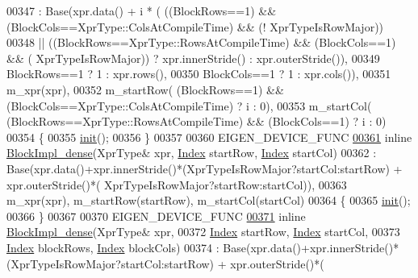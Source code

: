 \begin{DoxyCode}
00347       : Base(xpr.data() + i * (    ((BlockRows==1) && (BlockCols==XprType::ColsAtCompileTime) && (!
      XprTypeIsRowMajor)) 
00348                                 || ((BlockRows==XprType::RowsAtCompileTime) && (BlockCols==1) && ( 
      XprTypeIsRowMajor)) ? xpr.innerStride() : xpr.outerStride()),
00349              BlockRows==1 ? 1 : xpr.rows(),
00350              BlockCols==1 ? 1 : xpr.cols()),
00351         m\_xpr(xpr),
00352         m\_startRow( (BlockRows==1) && (BlockCols==XprType::ColsAtCompileTime) ? i : 0),
00353         m\_startCol( (BlockRows==XprType::RowsAtCompileTime) && (BlockCols==1) ? i : 0)
00354     \{
00355       \hyperlink{structinit}{init}();
00356     \}
00357 
00360     EIGEN\_DEVICE\_FUNC
\hyperlink{class_eigen_1_1internal_1_1_block_impl__dense_3_01_xpr_type_00_01_block_rows_00_01_block_cols_00_01_inner_panel_00_01true_01_4_aaa47737cd19396275d5bcb6d9520e49f}{00361}     \textcolor{keyword}{inline} \hyperlink{class_eigen_1_1internal_1_1_block_impl__dense_3_01_xpr_type_00_01_block_rows_00_01_block_cols_00_01_inner_panel_00_01true_01_4_aaa47737cd19396275d5bcb6d9520e49f}{BlockImpl\_dense}(XprType& xpr, \hyperlink{namespace_eigen_a62e77e0933482dafde8fe197d9a2cfde}{Index} startRow, 
      \hyperlink{namespace_eigen_a62e77e0933482dafde8fe197d9a2cfde}{Index} startCol)
00362       : Base(xpr.data()+xpr.innerStride()*(XprTypeIsRowMajor?startCol:startRow) + xpr.outerStride()*(
      XprTypeIsRowMajor?startRow:startCol)),
00363         m\_xpr(xpr), m\_startRow(startRow), m\_startCol(startCol)
00364     \{
00365       \hyperlink{structinit}{init}();
00366     \}
00367 
00370     EIGEN\_DEVICE\_FUNC
\hyperlink{class_eigen_1_1internal_1_1_block_impl__dense_3_01_xpr_type_00_01_block_rows_00_01_block_cols_00_01_inner_panel_00_01true_01_4_a9e2d1e641a5000ca0c10b1eaeab84adf}{00371}     \textcolor{keyword}{inline} \hyperlink{class_eigen_1_1internal_1_1_block_impl__dense_3_01_xpr_type_00_01_block_rows_00_01_block_cols_00_01_inner_panel_00_01true_01_4_a9e2d1e641a5000ca0c10b1eaeab84adf}{BlockImpl\_dense}(XprType& xpr,
00372           \hyperlink{namespace_eigen_a62e77e0933482dafde8fe197d9a2cfde}{Index} startRow, \hyperlink{namespace_eigen_a62e77e0933482dafde8fe197d9a2cfde}{Index} startCol,
00373           \hyperlink{namespace_eigen_a62e77e0933482dafde8fe197d9a2cfde}{Index} blockRows, \hyperlink{namespace_eigen_a62e77e0933482dafde8fe197d9a2cfde}{Index} blockCols)
00374       : Base(xpr.data()+xpr.innerStride()*(XprTypeIsRowMajor?startCol:startRow) + xpr.outerStride()*(

\end{DoxyCode}
